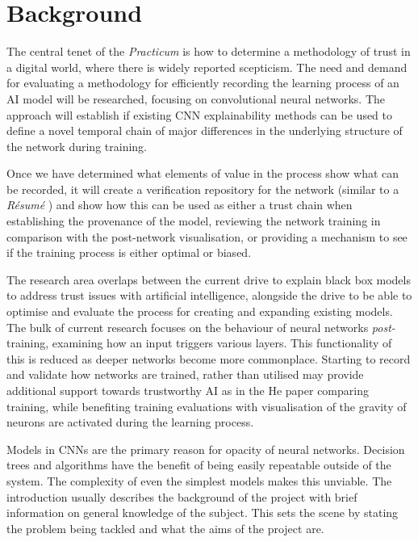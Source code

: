 \section{Background}

The central tenet of the \textit{Practicum} is how to determine a methodology of trust in a digital world, where there is widely reported scepticism. The need and demand for evaluating a methodology for efficiently recording the learning process of an AI model will be researched, focusing on convolutional neural networks. The approach will establish if existing CNN explainability methods can be used to define a novel temporal chain of major differences in the underlying structure of the network during training.
 
Once we have determined what elements of value in the process show what can be recorded, it will create a verification repository for the network (similar to a \textit{Résumé} ) and show how this can be used as either a trust chain when establishing the provenance of the model, reviewing the network training in comparison with the post-network visualisation, or providing a mechanism to see if the training process is either optimal or biased.

The research area overlaps between the current drive to explain black box models to address trust issues with artificial intelligence\cite{ryanAIWeTrust2020}, alongside the drive to be able to optimise and evaluate the process for creating and expanding existing models. The bulk of current research focuses on the behaviour of neural networks \textit{post-}training, examining how an input triggers various layers. This functionality of this is reduced as deeper networks become more commonplace. Starting to record and validate how networks are trained, rather than utilised may provide additional support towards trustworthy AI as in the He paper comparing training\cite{heDeepResidualLearning2015a}, while benefiting training evaluations with visualisation of the gravity of neurons are activated during the learning process.

Models in CNNs are the primary reason for opacity of neural networks. Decision trees and algorithms have the benefit of being easily repeatable outside of the system. The complexity of even the simplest models makes this unviable. The introduction usually describes the background of the project with brief information on general knowledge of the subject. This sets the scene by stating the problem being tackled and what the aims of the project are.

